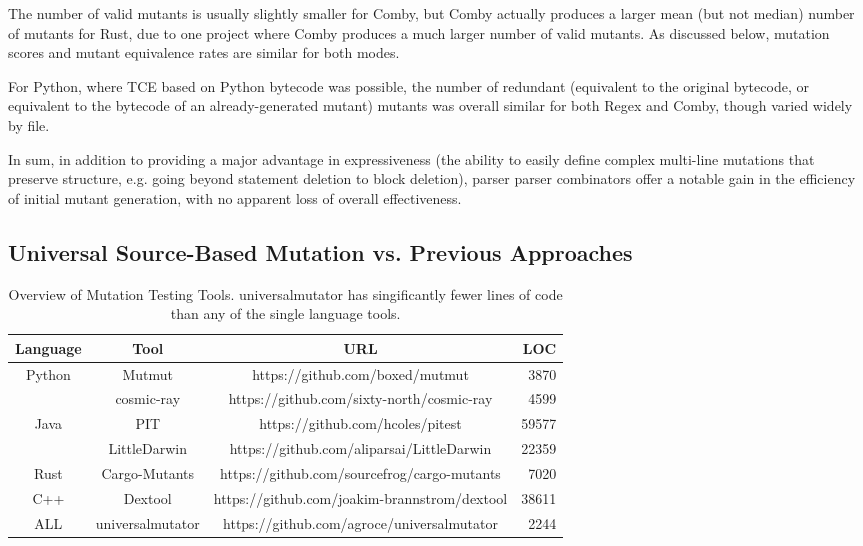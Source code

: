 \documentclass[sigconf,review, anonymous]{acmart}
\begin{document}
{The number of valid mutants is usually
slightly smaller for Comby, but Comby actually produces a larger mean
(but not median) number of mutants for Rust, due to one project where
Comby produces a much larger number of valid mutants.  As discussed 
below, mutation scores and mutant equivalence rates are similar for
both modes.

For Python, where TCE based on Python bytecode was possible, the
number of redundant (equivalent to the original bytecode, or
equivalent to the bytecode of an already-generated mutant) mutants was
overall similar for both Regex and Comby, though varied widely by file.

In sum, in addition to providing a major advantage in expressiveness
(the ability to easily define complex multi-line mutations that
preserve structure, e.g. going beyond statement deletion to block
deletion), parser parser combinators offer a notable gain in the
efficiency of initial mutant generation, with no apparent loss of overall effectiveness.

\subsection{Universal Source-Based Mutation vs. Previous Approaches}

\begin{table*}[hbtp]
    \centering
    \caption{Overview of Mutation Testing Tools. universalmutator has singificantly fewer lines of code than any of the single language tools.}
    \label{tab:mutationtools}
    
    \begin{tabular}{|c|c|c|r|}
    \hline
    \textbf{Language} & \textbf{Tool} & \textbf{URL} & \textbf{LOC}  \\
    \hline
    \multirow{2}{*}{Python}  & Mutmut & https://github.com/boxed/mutmut & 3870  \\\cline{2-4}
        & cosmic-ray & https://github.com/sixty-north/cosmic-ray & 4599 \\ \hline
    \multirow{2}{*}{Java}  & PIT & https://github.com/hcoles/pitest & 59577  \\\cline{2-4}
        & LittleDarwin & https://github.com/aliparsai/LittleDarwin & 22359 \\ \hline
        Rust & Cargo-Mutants & https://github.com/sourcefrog/cargo-mutants & 7020 \\\hline
        C++ & Dextool & https://github.com/joakim-brannstrom/dextool & 38611 \\\hline
        ALL & universalmutator & https://github.com/agroce/universalmutator & 2244 \\\hline
    \end{tabular}
    \end{table*}
    
}
\end{document}
